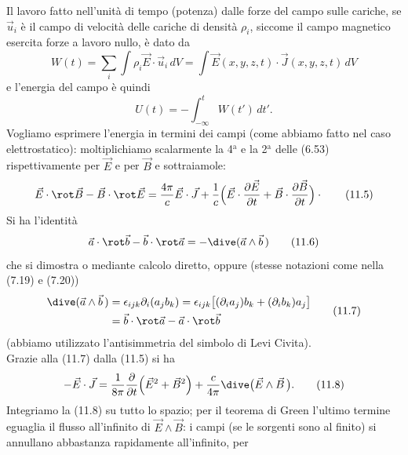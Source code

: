 Il lavoro fatto nell'unit\`a di tempo (potenza) dalle forze del campo sulle
cariche, se $\vec u_i$ \`e il campo di velocit\`a delle cariche di densit\`a
$\rho_i$, siccome il campo magnetico esercita forze a lavoro nullo, \`e dato da
\begin{equation}
  W(t)=\textstyle\sum_i\displaystyle\int\rho_i\vec E\cdot\vec u_i\,dV
  =\int\vec E(x,y,z,t)\cdot\vec J(x,y,z,t)\,dV
  \tag{11.3}
\end{equation}
e l'energia del campo \`e quindi
\begin{equation}
  U(t)=-\int_{-\infty}^tW(t')\,dt'.
  \tag{11.4}
\end{equation}
Vogliamo esprimere l'energia in termini dei campi (come abbiamo fatto nel caso
elettrostatico): moltiplichiamo scalarmente la 4$^\mathrm{a}$ e la
2$^\mathrm{a}$ delle (6.53) rispettivamente per $\vec E$
e per $\vec B$ e sottraiamole:
\begin{equation}
  \vec E\cdot\rot\vec B-\vec B\cdot\rot\vec E=\frac{4\pi}{c}\vec E\cdot\vec J
  +\frac{1}{c}\Big(\vec E\cdot\frac{\partial\vec E}{\partial t}
  +\vec B\cdot\frac{\partial\vec B}{\partial t}\Big)\cdot
  \tag{11.5}
\end{equation}
Si ha l'identit\`a
\begin{equation}
  \vec a\cdot\rot\vec b-\vec b\cdot\rot\vec a=-\dive(\vec a\wedge\vec b\,)
  \tag{11.6}
\end{equation}
che si dimostra o mediante calcolo diretto, oppure \big(stesse notazioni come
nella (7.19) e (7.20)\big)
\begin{equation}
  \begin{aligned}
    \dive(\vec a\wedge\vec b\,)&=\epsilon_{ijk}\partial_i(a_jb_k)
    =\epsilon_{ijk}\big[(\partial_ia_j)b_k+(\partial_ib_k)a_j\big]\\
    &=\vec b\cdot\rot\vec a-\vec a\cdot\rot\vec b
  \end{aligned}
  \tag{11.7}
\end{equation}
(abbiamo utilizzato l'antisimmetria del simbolo di Levi Civita).\\
Grazie alla (11.7) dalla (11.5) si ha
\begin{equation}
  -\vec E\cdot\vec J=\frac{1}{8\pi}\frac{\partial}{\partial t}
  \Big(\vec E^2+\vec B^2\Big)+\frac{c}{4\pi}\dive\big(\vec E\wedge\vec B\,\big).
  \tag{11.8}
\end{equation}
Integriamo la (11.8) su tutto lo spazio; per il teorema di Green l'ultimo
termine eguaglia il flusso all'infinito di $\vec E\wedge\vec B$: i campi (se le
sorgenti sono al finito) si annullano abbastanza rapidamente all'infinito, per
